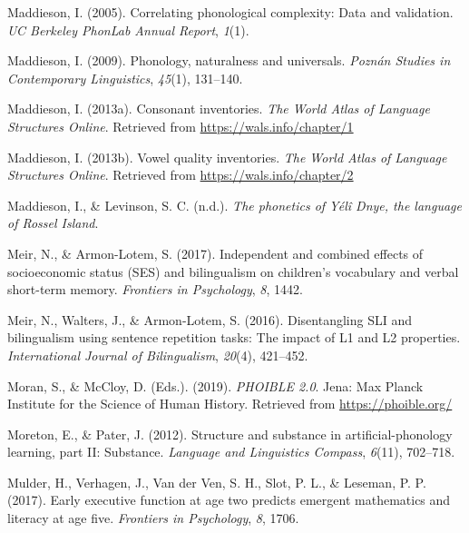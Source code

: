 \documentclass[english,,man,floatsintext]{apa6}
\begin{document}
\leavevmode\hypertarget{ref-maddieson2005correlating}{}%
Maddieson, I. (2005). Correlating phonological complexity: Data and validation. \emph{UC Berkeley PhonLab Annual Report}, \emph{1}(1).

\leavevmode\hypertarget{ref-maddieson2009phonology}{}%
Maddieson, I. (2009). Phonology, naturalness and universals. \emph{Poznán Studies in Contemporary Linguistics}, \emph{45}(1), 131--140.

\leavevmode\hypertarget{ref-maddieson2013consonant}{}%
Maddieson, I. (2013a). Consonant inventories. \emph{The World Atlas of Language Structures Online}. Retrieved from \url{https://wals.info/chapter/1}

\leavevmode\hypertarget{ref-maddieson2013vowel}{}%
Maddieson, I. (2013b). Vowel quality inventories. \emph{The World Atlas of Language Structures Online}. Retrieved from \url{https://wals.info/chapter/2}

\leavevmode\hypertarget{ref-maddiesonIPphoneticsYD}{}%
Maddieson, I., \& Levinson, S. C. (n.d.). \emph{The phonetics of Yélî Dnye, the language of Rossel Island}.

\leavevmode\hypertarget{ref-meir2017independent}{}%
Meir, N., \& Armon-Lotem, S. (2017). Independent and combined effects of socioeconomic status (SES) and bilingualism on children's vocabulary and verbal short-term memory. \emph{Frontiers in Psychology}, \emph{8}, 1442.

\leavevmode\hypertarget{ref-meir2016disentangling}{}%
Meir, N., Walters, J., \& Armon-Lotem, S. (2016). Disentangling SLI and bilingualism using sentence repetition tasks: The impact of L1 and L2 properties. \emph{International Journal of Bilingualism}, \emph{20}(4), 421--452.

\leavevmode\hypertarget{ref-phoible}{}%
Moran, S., \& McCloy, D. (Eds.). (2019). \emph{PHOIBLE 2.0}. Jena: Max Planck Institute for the Science of Human History. Retrieved from \url{https://phoible.org/}

\leavevmode\hypertarget{ref-moreton2012structure}{}%
Moreton, E., \& Pater, J. (2012). Structure and substance in artificial-phonology learning, part II: Substance. \emph{Language and Linguistics Compass}, \emph{6}(11), 702--718.

\leavevmode\hypertarget{ref-mulder2017early}{}%
Mulder, H., Verhagen, J., Van der Ven, S. H., Slot, P. L., \& Leseman, P. P. (2017). Early executive function at age two predicts emergent mathematics and literacy at age five. \emph{Frontiers in Psychology}, \emph{8}, 1706.
\end{document}
